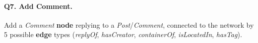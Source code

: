 \paragraph{\textbf{Q7}. Add Comment.}
Add a \emph{Comment} \textbf{node} replying to a
\emph{Post}/\emph{Comment}, connected to the network by 5 possible
\textbf{edge} types (\emph{replyOf}, \emph{hasCreator},
\emph{containerOf}, \emph{isLocatedIn}, \emph{hasTag}).
